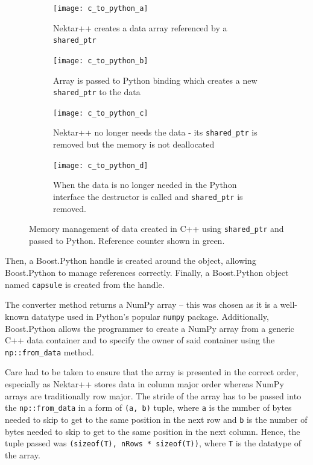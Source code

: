 \begin{figure}[h!]
    \centering
    \begin{subfigure}{0.6\textwidth}
        \texttt{[image: c\_to\_python\_a]}
        \caption{Nektar++ creates a data array referenced by a \texttt{shared\_ptr}}
        \label{fig:c_to_python_a}
    \end{subfigure}
    \begin{subfigure}{0.6\textwidth}
        \texttt{[image: c\_to\_python\_b]}
        \caption{Array is passed to Python binding which creates a new \texttt{shared\_ptr} 
        to the data}
        \label{fig:c_to_python_b}
    \end{subfigure}
    \begin{subfigure}{0.6\textwidth}
        \texttt{[image: c\_to\_python\_c]}
        \caption{Nektar++ no longer needs the data - its \texttt{shared\_ptr} is removed but 
        the memory is not deallocated}
        \label{fig:c_to_python_c}
    \end{subfigure}
    \begin{subfigure}{0.6\textwidth}
        \texttt{[image: c\_to\_python\_d]}
        \caption{When the data is no longer needed in the Python interface the destructor is 
        called and \texttt{shared\_ptr} is removed.}
        \label{fig:c_to_python_d}
    \end{subfigure}
    \caption{Memory management of data created in C++ using \texttt{shared\_ptr} and passed 
    to Python. Reference counter shown in green.}
    \label{fig:c_to_python}
\end{figure}

Then, a Boost.Python handle is created around the object, allowing Boost.Python to manage references 
correctly. Finally, a Boost.Python object named \texttt{capsule} is created from the handle.

The converter method returns a NumPy array -- this was chosen as it is a well-known datatype used 
in Python's popular \texttt{numpy} package. Additionally, Boost.Python allows the programmer to 
create a NumPy array from a generic C++ data container and to specify the owner of said container 
using the \texttt{np::from\_data} method. 

Care had to be taken to ensure that the array is presented in the correct order, especially as 
Nektar++ stores data in column major order whereas NumPy arrays are traditionally row major. 
The stride of the array has to be passed into the \texttt{np::from\_data} in a form of 
\texttt{(a, b)} tuple, where \texttt{a} is the number of bytes needed to skip to get to the 
same position in the next row and \texttt{b} is the number of bytes needed to skip to get to the 
same position in the next column. Hence, the tuple passed was \texttt{(sizeof(T), nRows * sizeof(T))}, 
where \texttt{T} is the datatype of the array.

